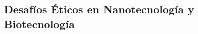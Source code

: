 \begin{refsection}
\chapter{Desafíos Éticos en Nanotecnología y Biotecnología}
\label{chapter:chapter-10}


\begin{comment}
\begin{enumerate}
\item \textbf{Desafíos Éticos en Nanotecnología y Biotecnología (Capítulo 10):}  
\begin{itemize}
    \item Reflexión sobre CRISPR, biopiratería y nanomateriales en medicina.
    \item Regulaciones éticas para garantizar acceso equitativo.
    \item Herramientas de trazabilidad con blockchain para evitar biopiratería.
    \item Actividad: Modelar la interacción de nanomateriales con tejidos biológicos usando \texttt{NumPy}.
\end{itemize}
\end{enumerate}
\end{comment}




\nocite{*}

\printbibliography[heading=subbibliography, title={Bibliografía del Capítulo 10}]
\end{refsection}
